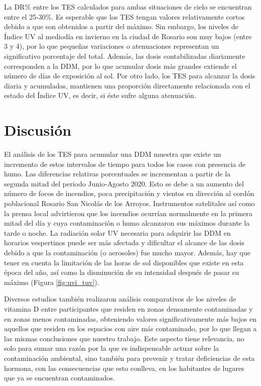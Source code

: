 La DR\% entre los TES calculados para ambas situaciones de cielo se encuentran entre el 25-30\%. Es esperable que los TES tengan valores relativamente cortos debido a que son obtenidos a partir del máximo. Sin embargo, los niveles de Índice UV al mediodía en invierno en la ciudad de Rosario son muy bajos (entre 3 y 4),  por lo que pequeñas variaciones o atenuaciones representan un significativo porcentaje del total. Además, las dosis contabilizadas diariamente corresponden a la DDM, por lo que acumular dosis más grandes extiende el número de días de exposición al sol. Por otro lado, los TES para alcanzar la dosis diaria y acumuladas, mantienen una proporción directamente relacionada con el estado del Índice UV, es decir, si éste sufre alguna atenuación.

\section*{Discusión}

El análisis de los TES para acumular una DDM muestra que existe un incremento de estos intervalos de tiempo para todos los casos con presencia de humo. Las diferencias relativas porcentuales se incrementan a partir de la segunda mitad del periodo Junio-Agosto 2020. Esto se debe a un aumento del número de focos de incendios, poca precipitación y vientos en dirección al cordón poblacional Rosario San Nicolás de los Arroyos. Instrumentos satelitales así como la prensa local advirtieron que los incendios ocurrían normalmente en la primera mitad del día y cuya contaminación o humo alcanzaron sus máximos durante la tarde o noche. La radiación solar UV necesaria para adquirir las DDM en horarios vespertinos puede ser más afectada y dificultar el alcance de las dosis debido a que la contaminación (o aerosoles) fue mucho mayor. Además, hay que tener en cuenta la limitación de las horas de sol disponibles que existe en esta época del año, así como la disminución de su intensidad después de pasar su máximo (Figura \ref{fig:uvi_tuv}).

Diversos estudios\cite{Feizabad_2017,Hosseinpanah_2010} también realizaron análisis comparativos de los niveles de vitamina D entre participantes que residen en zonas densamente contaminadas y en zonas menos contaminadas, obteniendo valores significativamente más bajos en aquellos que residen en los espacios con aire más contaminado, por lo que llegan a las mismas conclusiones que nuestro trabajo. Este aspecto tiene relevancia, no solo para sumar una razón por la que es indispensable actuar sobre la contaminación ambiental, sino también para prevenir y tratar deficiencias de esta hormona, con las consecuencias que esto conlleva, en los habitantes de lugares que ya se encuentran contaminados.

